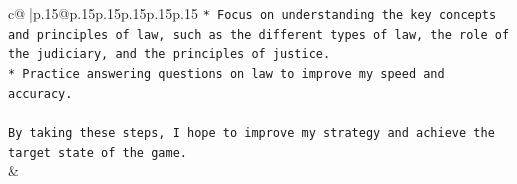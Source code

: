\documentclass{article}
\begin{document}
{\begin{supertabular}{c@{$\;$}|p{.15\linewidth}@{}p{.15\linewidth}p{.15\linewidth}p{.15\linewidth}p{.15\linewidth}p{.15\linewidth}}
{{{\texttt{* Focus on understanding the key concepts and principles of law, such as the different types of law, the role of the judiciary, and the principles of justice.} \\
\texttt{* Practice answering questions on law to improve my speed and accuracy.} \\
\\ 
\texttt{By taking these steps, I hope to improve my strategy and achieve the target state of the game.} \\
            }
        }
    }
    & \\ \\

\end{supertabular}
}
\end{document}
